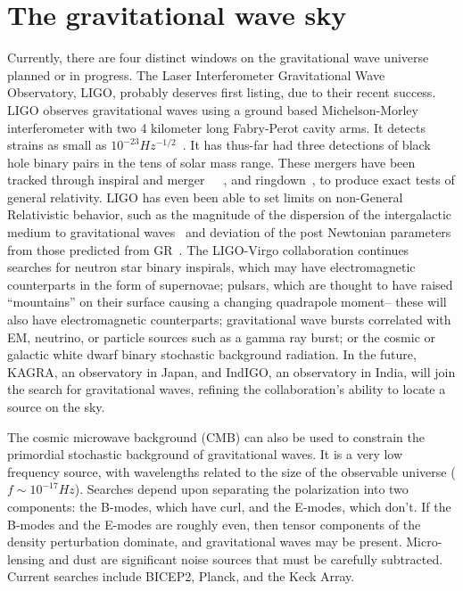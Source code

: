 \section{The gravitational wave sky}
Currently, there are four distinct windows on the gravitational wave universe planned or in progress. The Laser Interferometer Gravitational Wave Observatory, LIGO, probably deserves first listing, due to their recent success. LIGO observes gravitational waves using a ground based Michelson-Morley interferometer with two 4 kilometer long Fabry-Perot cavity arms. It detects strains as small as $10^{-23} Hz^{-1/2}$~\cite{LIGOsensitivity}. It has thus-far had three detections of black hole binary pairs in the tens of solar mass range. These mergers have been tracked through inspiral and merger~\cite{GW150914}~\cite{GW151226}~\cite{GW170104}, and ringdown~\cite{LIGO1e}, to produce exact tests of general relativity. LIGO has even been able to set limits on non-General Relativistic behavior, such as the magnitude of the dispersion of the intergalactic medium to gravitational waves~\cite{GW170104} and deviation of the post Newtonian parameters from those predicted from GR~\cite{LIGO1e}. The LIGO-Virgo collaboration continues searches for neutron star binary inspirals, which may have electromagnetic counterparts in the form of supernovae; pulsars, which are thought to have raised ``mountains'' on their surface causing a changing quadrapole moment-- these will also have electromagnetic counterparts; gravitational wave bursts correlated with EM, neutrino, or particle sources such as a gamma ray burst; or the cosmic or galactic white dwarf binary stochastic background radiation. In the future, KAGRA, an observatory in Japan, and IndIGO, an observatory in India, will join the search for gravitational waves, refining the collaboration's ability to locate a source on the sky. 


The cosmic microwave background (CMB) can also be used to constrain the primordial stochastic background of gravitational waves. It is a very low frequency source, with wavelengths related to the size of the observable universe ($f\sim 10^{-17} Hz$). Searches depend upon separating the polarization into two components: the B-modes, which have curl, and the E-modes, which don't. If the B-modes and the E-modes are roughly even, then tensor components of the density perturbation dominate, and gravitational waves may be present. Micro-lensing and dust are significant noise sources that must be carefully subtracted. Current searches include BICEP2, Planck, and the Keck Array. 


